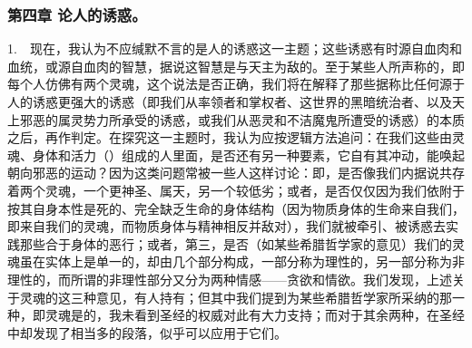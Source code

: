 
\subsubsection{第四章 论人的诱惑。}

1.　现在，我认为不应缄默不言的是人的诱惑这一主题；这些诱惑有时源自血肉和血统，或源自血肉的智慧，据说这智慧是与天主为敌的。至于某些人所声称的，即每个人仿佛有两个灵魂，这个说法是否正确，我们将在解释了那些据称比任何源于人的诱惑更强大的诱惑（即我们从率领者和掌权者、这世界的黑暗统治者、以及天上邪恶的属灵势力所承受的诱惑，或我们从恶灵和不洁魔鬼所遭受的诱惑）的本质之后，再作判定。在探究这一主题时，我认为应按逻辑方法追问：在我们这些由灵魂、身体和活力（）组成的人里面，是否还有另一种要素，它自有其冲动，能唤起朝向邪恶的运动？因为这类问题常被一些人这样讨论：即，是否像我们内据说共存着两个灵魂，一个更神圣、属天，另一个较低劣；或者，是否仅仅因为我们依附于按其自身本性是死的、完全缺乏生命的身体结构（因为物质身体的生命来自我们，即来自我们的灵魂，而物质身体与精神相反并敌对），我们就被牵引、被诱惑去实践那些合于身体的恶行；或者，第三，是否（如某些希腊哲学家的意见）我们的灵魂虽在实体上是单一的，却由几个部分构成，一部分称为理性的，另一部分称为非理性的，而所谓的非理性部分又分为两种情感——贪欲和情欲。我们发现，上述关于灵魂的这三种意见，有人持有；但其中我们提到为某些希腊哲学家所采纳的那一种，即灵魂是的，我未看到圣经的权威对此有大力支持；而对于其余两种，在圣经中却发现了相当多的段落，似乎可以应用于它们。\par


